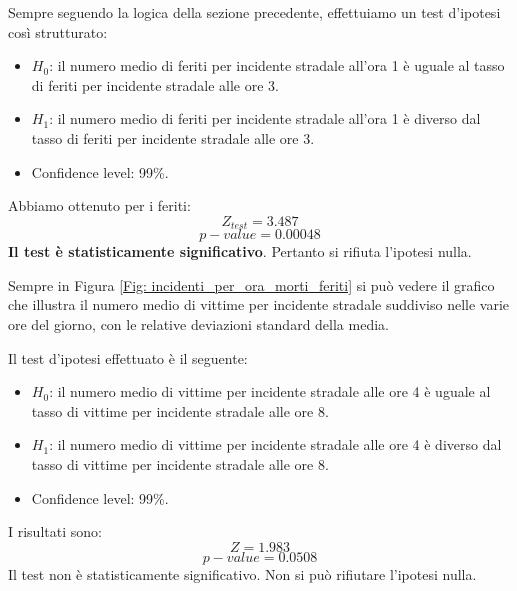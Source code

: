 \documentclass[12pt,a4paper,final,oneside]{article}			%
\begin{document}
        Sempre seguendo la logica della sezione precedente, effettuiamo un test d’ipotesi così strutturato:
        \begin{itemize}
            \item $H_0$: il numero medio di feriti per incidente stradale all’ora 1 è uguale al tasso di feriti per incidente stradale alle ore 3.
            \item $H_1$: il numero medio di feriti per incidente stradale all’ora 1 è diverso dal tasso di feriti per incidente stradale alle ore 3.
            \item Confidence level: 99\%.
        \end{itemize}
        Abbiamo ottenuto per i feriti:
        \[
            Z_{test} = 3.487
        \]
        \[
            p-value = 0.00048
        \]
        \textbf{Il test è statisticamente significativo}. Pertanto si rifiuta l’ipotesi nulla.
        
        Sempre in Figura \ref{Fig: incidenti_per_ora_morti_feriti} si può vedere il grafico che illustra il numero medio di vittime per incidente stradale suddiviso nelle varie ore del giorno, con le relative deviazioni standard della media.
        
         Il test d’ipotesi effettuato è il seguente:
         \begin{itemize}
             \item $H_0$: il numero medio di vittime per incidente stradale alle ore 4 è uguale al tasso di vittime per incidente stradale alle ore 8.
            \item $H_1$: il numero medio di vittime per incidente stradale alle ore 4 è diverso dal tasso di vittime per incidente stradale alle ore 8.
            \item Confidence level: 99\%.
         \end{itemize}
        I risultati sono:
        \[
            Z = 1.983
        \]
        \[
            p-value = 0.0508
        \]
        Il test non è statisticamente significativo. Non si può rifiutare l’ipotesi nulla.
        
\end{document}
